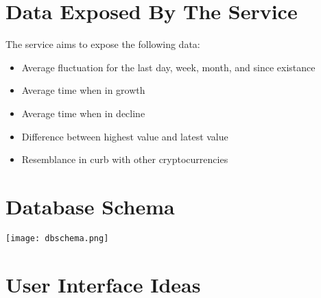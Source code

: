 \section{Data Exposed By The Service}
The service aims to expose the following data:
\begin{itemize}
    \item Average fluctuation for the last day, week, month, and since existance
    \item Average time when in growth
    \item Average time when in decline
    \item Difference between highest value and latest value
    \item Resemblance in curb with other cryptocurrencies
\end{itemize}
\section{Database Schema}
\begin{center}
    \texttt{[image: dbschema.png]}
\end{center}


\section{User Interface Ideas}